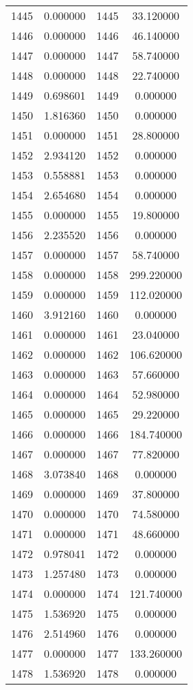 \documentclass[12pt]{article}
\begin{document}
\begin{longtable}{@{}cccc@{}}
1445 & 0.000000 & 1445 & 33.120000 \\
1446 & 0.000000 & 1446 & 46.140000 \\
1447 & 0.000000 & 1447 & 58.740000 \\
1448 & 0.000000 & 1448 & 22.740000 \\
1449 & 0.698601 & 1449 & 0.000000 \\
1450 & 1.816360 & 1450 & 0.000000 \\
1451 & 0.000000 & 1451 & 28.800000 \\
1452 & 2.934120 & 1452 & 0.000000 \\
1453 & 0.558881 & 1453 & 0.000000 \\
1454 & 2.654680 & 1454 & 0.000000 \\
1455 & 0.000000 & 1455 & 19.800000 \\
1456 & 2.235520 & 1456 & 0.000000 \\
1457 & 0.000000 & 1457 & 58.740000 \\
1458 & 0.000000 & 1458 & 299.220000 \\
1459 & 0.000000 & 1459 & 112.020000 \\
1460 & 3.912160 & 1460 & 0.000000 \\
1461 & 0.000000 & 1461 & 23.040000 \\
1462 & 0.000000 & 1462 & 106.620000 \\
1463 & 0.000000 & 1463 & 57.660000 \\
1464 & 0.000000 & 1464 & 52.980000 \\
1465 & 0.000000 & 1465 & 29.220000 \\
1466 & 0.000000 & 1466 & 184.740000 \\
1467 & 0.000000 & 1467 & 77.820000 \\
1468 & 3.073840 & 1468 & 0.000000 \\
1469 & 0.000000 & 1469 & 37.800000 \\
1470 & 0.000000 & 1470 & 74.580000 \\
1471 & 0.000000 & 1471 & 48.660000 \\
1472 & 0.978041 & 1472 & 0.000000 \\
1473 & 1.257480 & 1473 & 0.000000 \\
1474 & 0.000000 & 1474 & 121.740000 \\
1475 & 1.536920 & 1475 & 0.000000 \\
1476 & 2.514960 & 1476 & 0.000000 \\
1477 & 0.000000 & 1477 & 133.260000 \\
1478 & 1.536920 & 1478 & 0.000000 \\

\end{longtable}
\end{document}
